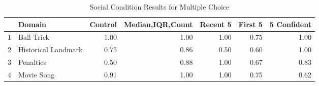 \documentclass[12pt]{article}
\begin{document}
\begin{table}[ht]
\centering
\begin{tabular}{rlrrrrr}
  \hline
 & Domain & Control & Median,IQR,Count & Recent 5 & First 5 & 5 Confident \\ 
  \hline
1 & Ball Trick & 1.00 & 1.00 & 1.00 & 0.75 & 1.00 \\ 
  2 & Historical Landmark & 0.75 & 0.86 & 0.50 & 0.60 & 1.00 \\ 
  3 & Penalties & 0.50 & 0.88 & 1.00 & 0.67 & 0.83 \\ 
  4 & Movie Song & 0.91 & 1.00 & 1.00 & 0.75 & 0.62 \\ 
   \hline
\end{tabular}
\caption{Social Condition Results for Multiple Choice}
\end{table}
\end{document}
